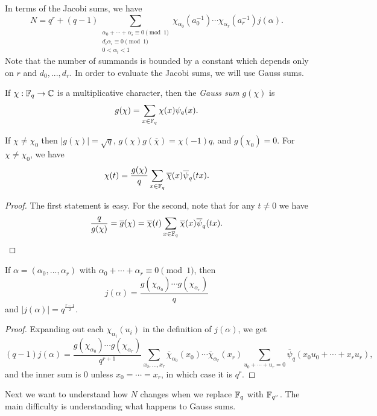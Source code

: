 \documentclass[letterpaper,11pt]{article}
\begin{document}
In terms of the Jacobi sums, we have
\[
N = q^r + (q-1)\sum_{\substack{\alpha_0+\cdots+\alpha_i \equiv 0\pmod{1}\\d_i\alpha_i\equiv 0 \pmod{1}\\0 < \alpha_i < 1}} \chi_{\alpha_0}(a_0^{-1})\cdots\chi_{\alpha_r}(a_r^{-1})j(\alpha).
\]
Note that the number of summands is bounded by a constant which depends only on $r$ and $d_0, ..., d_r$. In order to evaluate the Jacobi sums, we will use Gauss sums.

\begin{defn} If $\chi:\mathbb{F}_q\rightarrow \mathbb{C}$ is a multiplicative character, then the \emph{Gauss sum} $g(\chi)$ is
\[
g(\chi) = \sum_{x\in\mathbb{F}_q} \chi(x)\psi_q(x).
\]
\end{defn}

\begin{prop} If $\chi \ne \chi_0$ then $|g(\chi)| = \sqrt{q}$, $g(\chi)g(\overline{\chi}) = \chi(-1)q$, and $g(\chi_0) = 0$. For $\chi \ne \chi_0$, we have
\[
\chi(t) = \frac{g(\chi)}{q}\sum_{x\in\mathbb{F}_q} \overline{\chi}(x)\overline{\psi}_q(tx).
\]
\end{prop}
\begin{proof} The first statement is easy. For the second, note that for any $t\ne 0$ we have
\[
\frac{q}{g(\chi)} = \overline{g}(\chi) = \overline{\chi}(t)\sum_{x\in\mathbb{F}_q} \overline{\chi}(x)\overline{\psi}_q(tx).\qedhere
\]
\end{proof}

\begin{prop} If $\alpha = (\alpha_0, ..., \alpha_r)$ with $\alpha_0 + \cdots + \alpha_r \equiv 0 \pmod{1}$, then
\[
j(\alpha) = \frac{g(\chi_{\alpha_0})\cdots g(\chi_{\alpha_r})}{q}
\]
and $|j(\alpha)| = q^{\frac{r-1}{2}}$.
\end{prop}
\begin{proof} Expanding out each $\chi_{\alpha_i}(u_i)$ in the definition of $j(\alpha)$, we get
\[
(q-1)j(\alpha) = \frac{g(\chi_{\alpha_0})\cdots g(\chi_{\alpha_r})}{q^{r+1}} \sum_{x_0, ..., x_r} \overline{\chi}_{\alpha_0}(x_0)\cdots \overline{\chi}_{\alpha_r}(x_r) \sum_{u_0+\cdots + u_r=0} \overline{\psi}_q(x_0u_0 + \cdots + x_ru_r),
\]
and the inner sum is $0$ unless $x_0 = \cdots = x_r$, in which case it is $q^r$.
\end{proof}

Next we want to understand how $N$ changes when we replace $\mathbb{F}_q$ with $\mathbb{F}_{q^\nu}$. The main difficulty is understanding what happens to Gauss sums.
\end{document}
